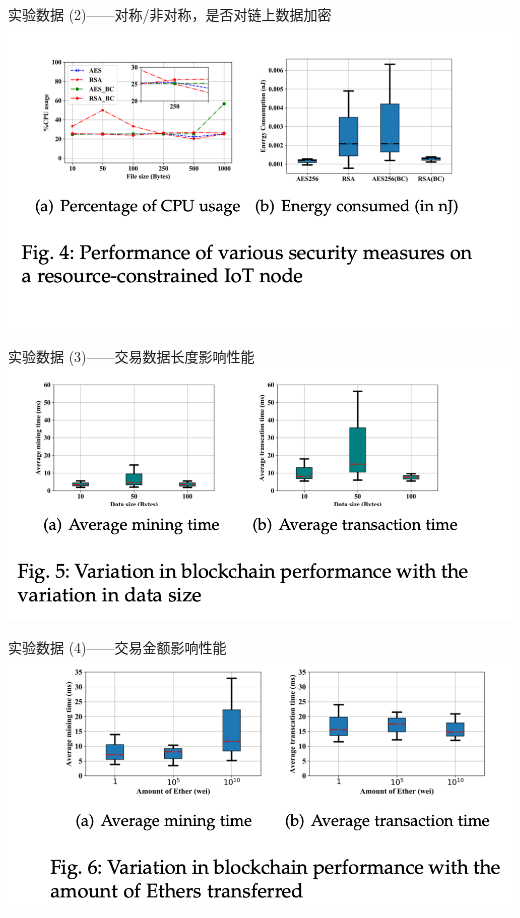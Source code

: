 \documentclass{beamer}
\begin{document}
\begin{frame}{实验数据 (2)——对称/非对称，是否对链上数据加密}
	\includegraphics[width=\linewidth]{Assets/图4}
\end{frame}

\begin{frame}{实验数据 (3)——交易数据长度影响性能}
	\includegraphics[width=\linewidth]{Assets/图5}
\end{frame}

\begin{frame}{实验数据 (4)——交易金额影响性能}
	\includegraphics[width=\linewidth]{Assets/图6}
\end{frame}
\end{document}
